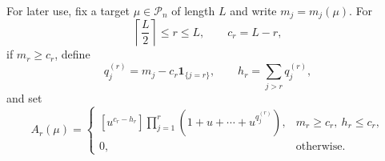 \documentclass[10pt,a4paper]{amsart}
\theoremstyle{definition}
\theoremstyle{remark}
\newcommand{\Part}{\mathcal P}
\begin{document}
For later use, fix a target $\mu\in\Part_n$ of length $L$ and write
$m_j=m_j(\mu)$.  For
\[
             \left\lceil\frac L2\right\rceil\leq r\leq L,
             \qquad c_r=L-r,
\]
if $m_r\geq c_r$, define
\begin{equation}\label{eq:q-and-h}
 q_j^{(r)}=m_j-c_r\mathbf 1_{\{j=r\}},\qquad
 h_r=\sum_{j>r}q_j^{(r)},
\end{equation}
and set
\begin{equation}\label{eq:Ar}
 A_r(\mu)=
 \begin{cases}
 [u^{c_r-h_r}]\displaystyle\prod_{j=1}^{r}
       (1+u+\cdots+u^{q_j^{(r)}}),&m_r\geq c_r,\ h_r\leq c_r,\\
 0,&\text{otherwise}.
 \end{cases}
\end{equation}
\end{document}
